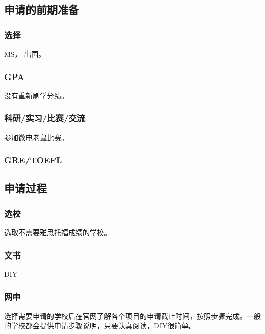 \documentclass[a4paper,UTF8]{book}
\begin{document}
    \subsection*{申请的前期准备}
        \subsubsection*{选择}
        MS， 出国。
        \subsubsection*{GPA}
        没有重新刷学分绩。
        \subsubsection*{科研/实习/比赛/交流}
        参加微电老鼠比赛。
        \subsubsection*{GRE/TOEFL}

    \subsection*{申请过程}
        \subsubsection*{选校}
        选取不需要雅思托福成绩的学校。
        \subsubsection*{文书}
        DIY
        \subsubsection*{网申}
        选择需要申请的学校后在官网了解各个项目的申请截止时间，按照步骤完成。一般的学校都会提供申请步骤说明，只要认真阅读，DIY很简单。
\end{document}
